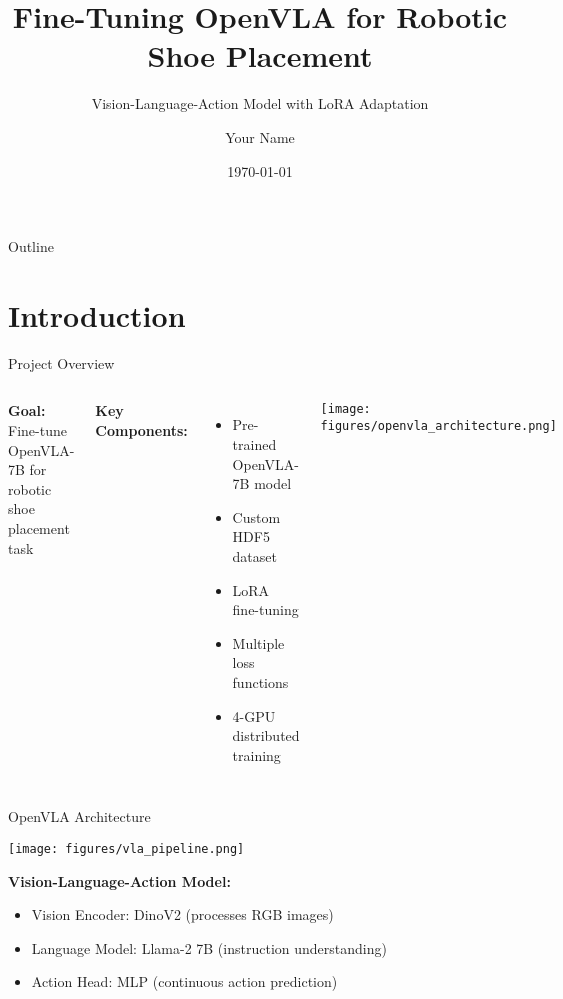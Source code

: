\documentclass[aspectratio=169]{beamer}
\title{Fine-Tuning OpenVLA for Robotic Shoe Placement}
\subtitle{Vision-Language-Action Model with LoRA Adaptation}
\author{Your Name}
\date{\today}
\begin{document}
\begin{frame}
\titlepage
\end{frame}

\begin{frame}{Outline}
\tableofcontents
\end{frame}

\section{Introduction}

\begin{frame}{Project Overview}
\begin{columns}
\textbf{Goal:} Fine-tune OpenVLA-7B for robotic shoe placement task

\vspace{0.5cm}
\textbf{Key Components:}
\begin{itemize}
    \item Pre-trained OpenVLA-7B model
    \item Custom HDF5 dataset
    \item LoRA fine-tuning
    \item Multiple loss functions
    \item 4-GPU distributed training
\end{itemize}

\begin{center}
\texttt{[image: figures/openvla\_architecture.png]}
\end{center}
\end{columns}
\end{frame}

\begin{frame}{OpenVLA Architecture}
\begin{center}
\texttt{[image: figures/vla\_pipeline.png]}
\end{center}

\textbf{Vision-Language-Action Model:}
\begin{itemize}
    \item Vision Encoder: DinoV2 (processes RGB images)
    \item Language Model: Llama-2 7B (instruction understanding)
    \item Action Head: MLP (continuous action prediction)
\end{itemize}
\end{frame}
\end{document}
